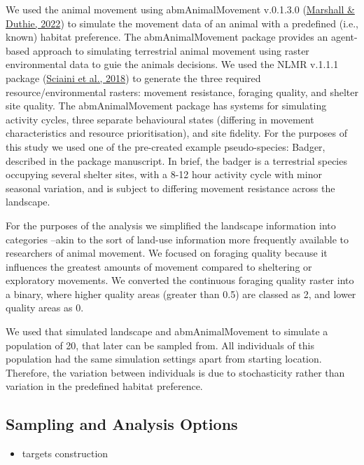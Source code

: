 \documentclass[10pt,a4paper]{article}
\providecommand{\tightlist}{%
  \setlength{\itemsep}{0pt}\setlength{\parskip}{0pt}}
\begin{document}
We used the animal movement using abmAnimalMovement v.0.1.3.0 (\protect\hyperlink{ref-abmAnimalMovement}{Marshall \& Duthie, 2022}) to simulate the movement data of an animal with a predefined (i.e., known) habitat preference.
The abmAnimalMovement package provides an agent-based approach to simulating terrestrial animal movement using raster environmental data to guie the animals decisions.
We used the NLMR v.1.1.1 package (\protect\hyperlink{ref-NLMR}{Sciaini et al., 2018}) to generate the three required resource/environmental rasters: movement resistance, foraging quality, and shelter site quality.
The abmAnimalMovement package has systems for simulating activity cycles, three separate behavioural states (differing in movement characteristics and resource prioritisation), and site fidelity.
For the purposes of this study we used one of the pre-created example pseudo-species: Badger, described in the package manuscript.
In brief, the badger is a terrestrial species occupying several shelter sites, with a 8-12 hour activity cycle with minor seasonal variation, and is subject to differing movement resistance across the landscape.

For the purposes of the analysis we simplified the landscape information into categories --akin to the sort of land-use information more frequently available to researchers of animal movement.
We focused on foraging quality because it influences the greatest amounts of movement compared to sheltering or exploratory movements.
We converted the continuous foraging quality raster into a binary, where higher quality areas (greater than 0.5) are classed as 2, and lower quality areas as 0.

We used that simulated landscape and abmAnimalMovement to simulate a population of 20, that later can be sampled from.
All individuals of this population had the same simulation settings apart from starting location.
Therefore, the variation between individuals is due to stochasticity rather than variation in the predefined habitat preference.

\hypertarget{sampling-and-analysis-options}{%
\subsection{Sampling and Analysis Options}\label{sampling-and-analysis-options}}

\begin{itemize}
\tightlist
\item
  targets construction
\end{itemize}
\end{document}
